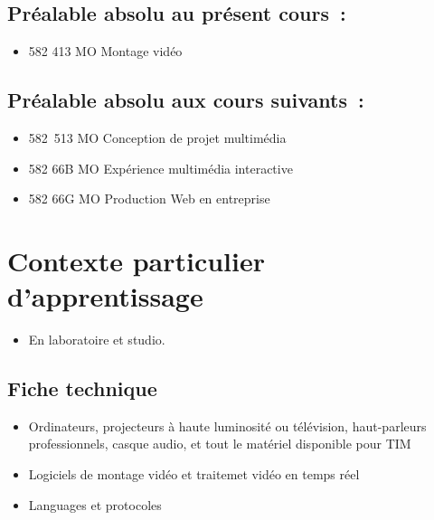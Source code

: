 \documentclass[
]{book}
\providecommand{\tightlist}{%
  \setlength{\itemsep}{0pt}\setlength{\parskip}{0pt}}
\begin{document}
\hypertarget{pruxe9alable-absolu-au-pruxe9sent-cours}{%
\subsection{Préalable absolu au présent cours~:}\label{pruxe9alable-absolu-au-pruxe9sent-cours}}

\begin{itemize}
\tightlist
\item
  582 413 MO Montage vidéo
\end{itemize}

\hypertarget{pruxe9alable-absolu-aux-cours-suivants}{%
\subsection{Préalable absolu aux cours suivants~:}\label{pruxe9alable-absolu-aux-cours-suivants}}

\begin{itemize}
\tightlist
\item
  582~513 MO Conception de projet multimédia
\item
  582 66B MO Expérience multimédia interactive
\item
  582 66G MO Production Web en entreprise
\end{itemize}

\hypertarget{contexte-particulier-dapprentissage}{%
\section{Contexte particulier d'apprentissage}\label{contexte-particulier-dapprentissage}}

\begin{itemize}
\tightlist
\item
  En laboratoire et studio.
\end{itemize}

\hypertarget{fiche-technique}{%
\subsection{Fiche technique}\label{fiche-technique}}

\begin{itemize}
\tightlist
\item
  Ordinateurs, projecteurs à haute luminosité ou télévision, haut-parleurs professionnels, casque audio, et tout le matériel disponible pour TIM
\item
  Logiciels de montage vidéo et traitemet vidéo en temps réel
\item
  Languages et protocoles
\end{itemize}
\end{document}
